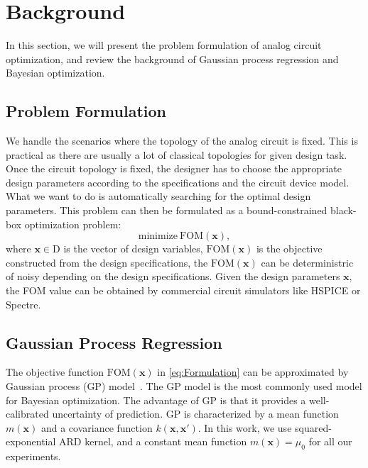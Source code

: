 \section{Background}

In this section, we will present the problem formulation of analog circuit optimization, and review the background of Gaussian process regression and Bayesian optimization.

\subsection{Problem Formulation}


We handle the scenarios where the topology of the analog circuit is fixed. This
is practical as there are usually a lot of classical topologies for given
design task. Once the circuit topology is fixed, the designer has to choose the
appropriate design parameters according to the specifications and the circuit
device model. What we want to do is automatically searching for the optimal
design parameters. This problem can then be formulated as a bound-constrained
black-box optimization problem:
\begin{equation}
    \label{eq:Formulation}
    \text{minimize}~\mathrm{FOM}(\bm{x}),
\end{equation}
where $\bm{x} \in \textrm{D}$ is the vector of design variables,
$\mathrm{FOM}(\bm{x})$ is the objective constructed from the design
specifications, the $\mathrm{FOM}(\bm{x})$ can be deterministric of noisy
depending on the design specifications. Given the design parameters $\bm{x}$,
the FOM value can be obtained by commercial circuit simulators like HSPICE or
Spectre.

\subsection{Gaussian Process Regression}


The objective function $\mathrm{FOM}(\bm{x})$ in \eqref{eq:Formulation} can be approximated by Gaussian
process (GP) model~\cite{GPML}. The GP model is the most commonly used model
for Bayesian optimization. The advantage of GP is that it provides a
well-calibrated uncertainty of prediction. GP is characterized by a mean
function $m(\bm{x})$ and a covariance function $k(\bm{x}, \bm{x'})$. In this
work, we use squared-exponential ARD kernel, and a constant mean function
$m(\bm{x}) = \mu_0$ for all our experiments.

